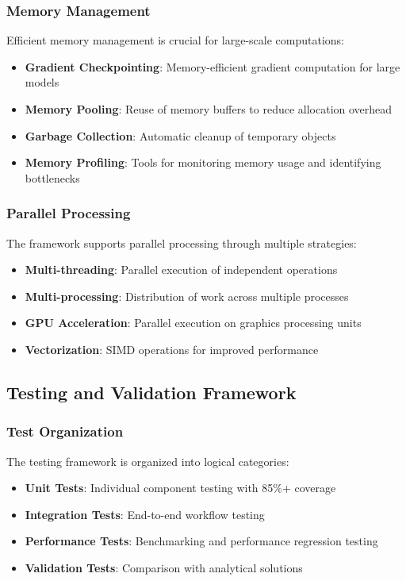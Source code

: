 \subsubsection{Memory Management}

Efficient memory management is crucial for large-scale computations:

\begin{itemize}
    \item \textbf{Gradient Checkpointing}: Memory-efficient gradient computation for large models
    \item \textbf{Memory Pooling}: Reuse of memory buffers to reduce allocation overhead
    \item \textbf{Garbage Collection}: Automatic cleanup of temporary objects
    \item \textbf{Memory Profiling}: Tools for monitoring memory usage and identifying bottlenecks
\end{itemize}

\subsubsection{Parallel Processing}

The framework supports parallel processing through multiple strategies:

\begin{itemize}
    \item \textbf{Multi-threading}: Parallel execution of independent operations
    \item \textbf{Multi-processing}: Distribution of work across multiple processes
    \item \textbf{GPU Acceleration}: Parallel execution on graphics processing units
    \item \textbf{Vectorization}: SIMD operations for improved performance
\end{itemize}

\subsection{Testing and Validation Framework}

\subsubsection{Test Organization}

The testing framework is organized into logical categories:

\begin{itemize}
    \item \textbf{Unit Tests}: Individual component testing with 85\%+ coverage
    \item \textbf{Integration Tests}: End-to-end workflow testing
    \item \textbf{Performance Tests}: Benchmarking and performance regression testing
    \item \textbf{Validation Tests}: Comparison with analytical solutions
\end{itemize}

